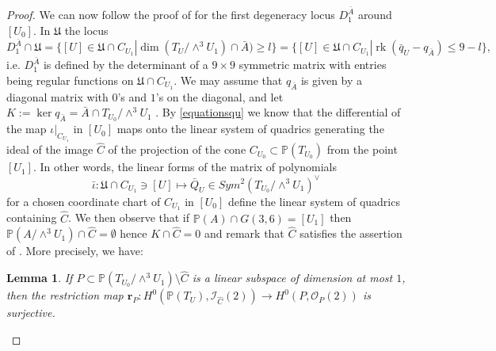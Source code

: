 \documentclass[a4paper,11pt]{amsart}
\newtheorem{lem}[thm]{Lemma}
\theoremstyle{definition}
\numberwithin{equation}{section}
\numberwithin{equation}{section} \theoremstyle{definition}
\begin{document}
\begin{proof}
We can now follow the proof of \cite[Lemma 2.9]{EPWcubes} for the first degeneracy locus $D_1^{\bar{A}}$ around $[U_0]$. In $\mathfrak{U}$ the locus 
$$D_1^{\bar{A}}\cap \mathfrak{U}=\{[U]\in \mathfrak{U}\cap C_{U_1} | \dim (T_U/\wedge^3 U_1) \cap \bar{A})\geq l\} = \{[U]\in \mathfrak{U}\cap C_{U_1} |\operatorname{rk} (\bar{q}_U-q_{\bar{A}})\leq 9-l\},$$ i.e. $D_1^{\bar{A}}$
is defined by the determinant of a $9\times 9$ symmetric matrix with entries being regular functions on  $\mathfrak{U}\cap C_{U_1}$. We may assume that $q_{\bar{A}}$ is given by a diagonal matrix  with $0$'s and $1$'s on the diagonal, and let $K:=\ker q_{\bar{A}}=\bar{A}\cap T_{U_0}/\wedge^3 U_1$ .  By \ref{equationsqu} we know that the differential of  the map $\iota|_{C_{U_1}}$ in $[U_0]$ maps onto the linear system of quadrics generating the ideal of the image $\hat{C}$ of the projection of the cone $C_{U_0}\subset \mathbb{P}(T_{U_0})$ from the point $[U_1]$. In other words, the linear forms of the matrix of polynomials
$$\bar{\iota}: \mathfrak{U}\cap C_{U_1}  \ni [U]\mapsto \bar{Q}_U\in Sym^2 (T_{U_0}/\wedge^3 U_1)^{\vee}$$  
for a chosen coordinate chart of $C_{U_1}$ in $[U_0]$ define the linear system of quadrics containing $\hat{C}$. We then observe that if $\mathbb{P}(A)\cap G(3,6)=[U_1]$ then $\mathbb{P}(A/\wedge^3U_1) \cap \hat{C}=\emptyset$ hence $K\cap  \hat{C}=0$ and remark that $\hat{C}$ satisfies the assertion of \cite[Lemma 2.8]{EPWcubes}. More precisely, we have:
  \begin{lem}\label{restriction of quadrics to K} If $P\subset {{\mathbb{P}}}(T_{U_0}/\wedge^3 U_1)\setminus \hat{C}$ is a linear subspace of dimension at most $1$,  then the restriction map $\mathbf{r}_P: H^0({{\mathbb{P}}}(T_{U}), \mathcal{I}_{\hat{C}}(2)) \to H^0(P, \mathcal{O}_{P}(2))$ is surjective.
  \end{lem}

\end{proof}
\end{document}
